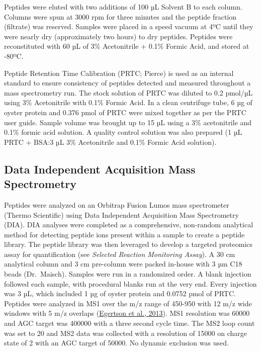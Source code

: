 \documentclass [11pt, proquest] {uwthesis}[2015/03/03]
\begin{document}
Peptides were eluted with two additions of 100 µL Solvent B to each column. Columns were spun at 3000 rpm for three minutes and the peptide fraction (filtrate) was reserved. Samples were placed in a speed vacuum at 4ºC until they were nearly dry (approximately two hours) to dry peptides. Peptides were reconstituted with 60 µL of 3\% Acetonitrile + 0.1\% Formic Acid, and stored at -80ºC.

Peptide Retention Time Calibration (PRTC; Pierce) is used as an internal standard to ensure consistency of peptides detected and measured throughout a mass spectrometry run. The stock solution of PRTC was diluted to 0.2 pmol/µL using 3\% Acetonitrile with 0.1\% Formic Acid. In a clean centrifuge tube, 6 µg of oyster protein and 0.376 pmol of PRTC were mixed together as per the PRTC user guide. Sample volume was brought up to 15 µL using a 3\% acetonitrile and 0.1\% formic acid solution. A quality control solution was also prepared (1 µL PRTC + BSA:3 µL 3\% Acetonitrile and 0.1\% Formic Acid solution).

\hypertarget{data-independent-acquisition-mass-spectrometry}{%
\subsection{Data Independent Acquisition Mass Spectrometry}\label{data-independent-acquisition-mass-spectrometry}}

Peptides were analyzed on an Orbitrap Fusion Lumos mass spectrometer (Thermo Scientific) using Data Independent Acquisition Mass Spectrometry (DIA). DIA analyses were completed as a comprehensive, non-random analytical method for detecting peptide ions present within a sample to create a peptide library. The peptide library was then leveraged to develop a targeted proteomics assay for quantification (see \emph{Selected Reaction Monitoring Assay}). A 30 cm analytical column and 3 cm pre-column were packed in-house with 3 µm C18 beads (Dr.~Maisch). Samples were run in a randomized order. A blank injection followed each sample, with procedural blanks run at the very end. Every injection was 3 µL, which included 1 µg of oyster protein and 0.0752 pmol of PRTC. Peptides were analyzed in MS1 over the m/z range of 450-950 with 12 m/z wide windows with 5 m/z overlaps (\protect\hyperlink{ref-Egertson2013}{Egertson et al., 2013}). MS1 resolution was 60000 and AGC target was 400000 with a three second cycle time. The MS2 loop count was set to 20 and MS2 data was collected with a resolution of 15000 on charge state of 2 with an AGC target of 50000. No dynamic exclusion was used.
\end{document}

